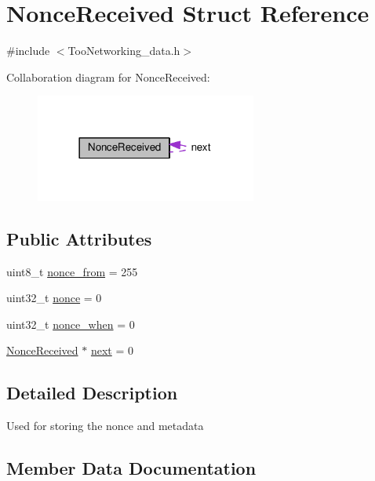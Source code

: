 \hypertarget{structNonceReceived}{}\section{Nonce\+Received Struct Reference}
\label{structNonceReceived}


{\ttfamily \#include $<$Too\+Networking\+\_\+data.\+h$>$}



Collaboration diagram for Nonce\+Received\+:\nopagebreak
\begin{figure}[H]
\begin{center}
\leavevmode
\includegraphics[width=206pt]{structNonceReceived__coll__graph}
\end{center}
\end{figure}
\subsection*{Public Attributes}
\begin{DoxyCompactItemize}
\item 
uint8\+\_\+t \hyperlink{structNonceReceived_aa6f2777bb591400ce057bd1fa9b23fca}{nonce\+\_\+from} = 255
\item 
uint32\+\_\+t \hyperlink{structNonceReceived_a8da2f90de05746f252706f24ec5bc539}{nonce} = 0
\item 
uint32\+\_\+t \hyperlink{structNonceReceived_a70f93629f2db41ac9f7850c83df5debd}{nonce\+\_\+when} = 0
\item 
\hyperlink{structNonceReceived}{Nonce\+Received} $\ast$ \hyperlink{structNonceReceived_ad976d0df8941f1f626de24afd2febca7}{next} = 0
\end{DoxyCompactItemize}


\subsection{Detailed Description}
Used for storing the nonce and metadata 

\subsection{Member Data Documentation}
\mbox{\label{structNonceReceived_ad976d0df8941f1f626de24afd2febca7}} 
